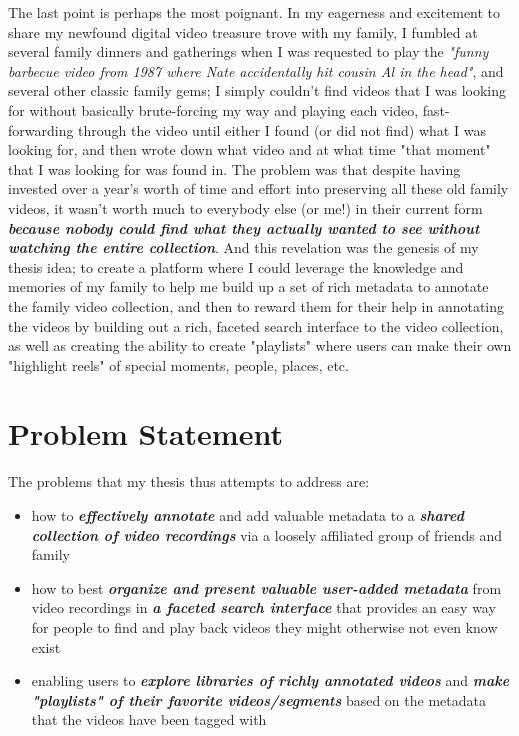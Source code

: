 The last point is perhaps the most poignant. In my eagerness and excitement to share my newfound digital video treasure trove with my family, I fumbled at several family dinners and gatherings when I was requested to play the \textit{"funny barbecue video from 1987 where Nate accidentally hit cousin Al in the head"}, and several other classic family gems; I simply couldn't find videos that I was looking for without basically brute-forcing my way and playing each video, fast-forwarding through the video until either I found (or did not find) what I was looking for, and then wrote down what video and at what time "that moment" that I was looking for was found in.  The problem was that despite having invested over a year's worth of time and effort into preserving all these old family videos, it wasn't worth much to everybody else (or me!) in their current form \textit{\textbf{because nobody could find what they actually wanted to see without watching the entire collection}}.  And this revelation was the genesis of my thesis idea; to create a platform where I could leverage the knowledge and memories of my family to help me build up a set of rich metadata to annotate the family video collection, and then to reward them for their help in annotating the videos by building out a rich, faceted search interface to the video collection, as well as creating the ability to create "playlists" where users can make their own "highlight reels" of special moments, people, places, etc.



\section{Problem Statement}
\label{sec:problem-statement:description}

The problems that my thesis thus attempts to address are:

\begin{itemize}
\item how to \textbf{\textit{effectively annotate}} and add valuable metadata to a \textbf{\textit{shared collection of video recordings}} via a loosely affiliated group of friends and family
\item how to best \textbf{\textit{organize and present valuable user-added metadata}} from video recordings in \textbf{\textit{a faceted search interface}} that provides an easy way for people to find and play back videos they might otherwise not even know exist
\item enabling users to \textbf{\textit{explore libraries of richly annotated videos}} and \textbf{\textit{make "playlists" of their favorite videos/segments}} based on the metadata that the videos have been tagged with
\end{itemize}


